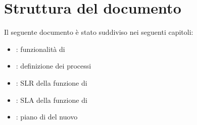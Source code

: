 %
%
\section{Struttura del documento}
\label{abs-document-structure}
Il seguente documento è stato suddiviso nei seguenti capitoli:

\begin{itemize}
\item{: funzionalità di }
\item{: definizione dei processi}
\item{: \ac{SLR} della funzione di }
\item{: \ac{SLA} della funzione di }
\item{: piano di  del nuovo }
\end{itemize}